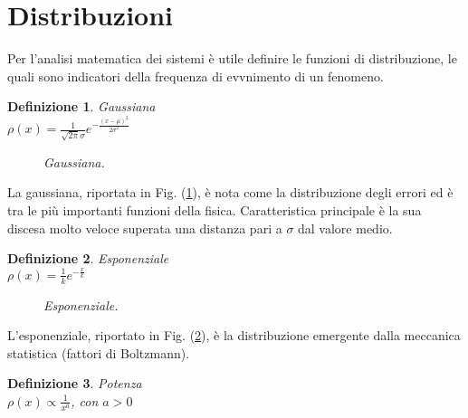 \documentclass[12pt, a4paper]{book}
\theoremstyle{theorem}
\newtheorem{definition}{Definizione}[section]
\begin{document}
		\section{Distribuzioni}
		Per l'analisi matematica dei sistemi è utile definire le funzioni di distribuzione, le quali sono indicatori della frequenza di evvnimento di un fenomeno.
		\begin{definition}
			Gaussiana\\$\rho(x)=\frac{1}{\sqrt{2\pi}\sigma}e^{-\frac{(x-\mu)^2}{2\sigma^2}}$
		\end{definition}
		\begin{figure}[H]
			\centering
			\caption{\emph{Gaussiana.}}
			\label{figure:gaussiana}
		\end{figure}
		La gaussiana, riportata in Fig. (\ref{figure:gaussiana}), è nota come la distribuzione degli errori ed è tra le più importanti funzioni della fisica.
		Caratteristica principale è la sua discesa molto veloce superata una distanza pari a $\sigma$ dal valore medio.
		\begin{definition}
			Esponenziale\\$\rho(x)=\frac{1}{k}e^{-\frac{x}{k}}$
		\end{definition}
		\begin{figure}[H]
			\centering
			\caption{\emph{Esponenziale.}}
			\label{figure:esponenziale}
		\end{figure}
		L'esponenziale, riportato in Fig. (\ref{figure:esponenziale}), è la distribuzione emergente dalla meccanica statistica (fattori di Boltzmann).
		\begin{definition}
			Potenza\\$\rho(x)\propto\frac{1}{x^a}$, con $a>0$
		\end{definition}
\end{document}
